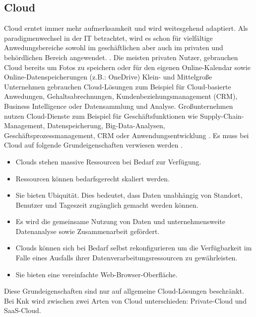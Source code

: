 \documentclass[12pt,bibtotoc]{article}
\begin{document}
		\subsection{Cloud}
		Cloud erntet immer mehr aufmerksamkeit und wird weitesgehend adaptiert. Als paradigmenwechsel in der IT betrachtet, wird es schon für vielfältige Anwedungsbereiche sowohl im geschäftlichen aber auch im privaten und behördlichen Bereich angewendet. \cite{Murugesan.2016}.
		\newline
		Die meisten privaten Nutzer, gebrauchen Cloud bereits um Fotos zu speichern oder für den eigenen Online-Kalendar sowie Online-Datenspeicherungen (z.B.: OneDrive)
		Klein- und Mittelgroße Unternehmen gebrauchen Cloud-Lösungen zum Beispiel für Cloud-basierte Anwedungen, Gehaltsabrechnungen, Kundenbeziehungsmanagement (CRM), Business Intelligence oder Datensammlung und Analyse.
		Großunternehmen nutzen Cloud-Dienste zum Beispiel für Geschäftsfunktionen wie Supply-Chain-Management, Datenspeicherung, Big-Data-Analysen, Geschäftsprozessmanagement, CRM oder Anwendungsentwicklung \cite{Murugesan.2016}.
		\newline
			Es muss bei Cloud auf folgende Grundeigenschaften verwiesen werden \cite{Murugesan.2016}.
			\begin{itemize}
				\item Clouds stehen massive Ressourcen bei Bedarf zur Verfügung.
				\item Ressourcen können bedarfsgerecht skaliert werden.
				\item Sie bieten Ubiquität. Dies bedeutet, dass Daten unabhängig von Standort, Benutzer und Tageszeit zugänglich gemacht werden können.
				\item Es wird die gemeinsame Nutzung von Daten und unternehmensweite Datenanalyse sowie Zusammenarbeit gefördert.
				\item Clouds können sich bei Bedarf selbst rekonfigurieren um die Verfügbarkeit im Falle eines Ausfalls ihrer Datenverarbeitungsressourcen zu gewährleisten.
				\item Sie bieten eine vereinfachte Web-Browser-Oberfläche.
			\end{itemize}
		Diese Grundeigenschaften sind nur auf allgemeine Cloud-Lösungen beschränkt. \newline
		Bei Knk wird zwischen zwei Arten von Cloud unterschieden: Private-Cloud und SaaS-Cloud.
\end{document}
